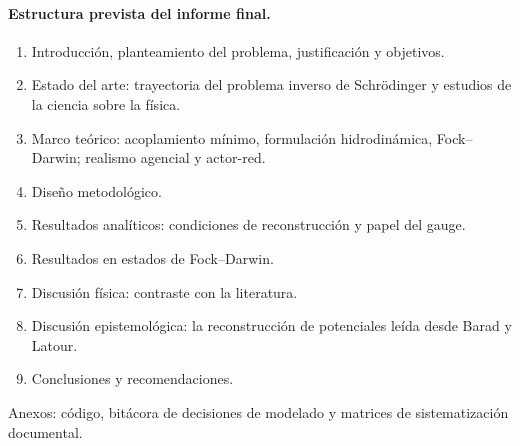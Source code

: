 \documentclass[12pt,letterpaper]{article}
\begin{document}
\paragraph{Estructura prevista del informe final.}
\begin{enumerate}[label=Cap.~\arabic*.,leftmargin=4em]
  \item Introducción, planteamiento del problema, justificación y objetivos.
  \item Estado del arte: trayectoria del problema inverso de Schrödinger y estudios de la ciencia sobre la física.
  \item Marco teórico: acoplamiento mínimo, formulación hidrodinámica, Fock--Darwin; realismo agencial y actor-red.
  \item Diseño metodológico.
  \item Resultados analíticos: condiciones de reconstrucción y papel del gauge.
  \item Resultados en estados de Fock--Darwin.
  \item Discusión física: contraste con la literatura.
  \item Discusión epistemológica: la reconstrucción de potenciales leída desde Barad y Latour.
  \item Conclusiones y recomendaciones.
\end{enumerate}
Anexos: código, bitácora de decisiones de modelado y matrices de sistematización documental.
\end{document}

